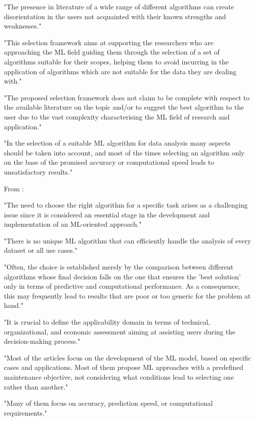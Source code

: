 "The presence in literature of a wide range of different algorithms can create disorientation in the users not acquainted with their known strengths and weaknesses."

"This selection framework aims at supporting the researchers who are approaching the ML field guiding them through the selection of a set of algorithms suitable for their scopes, helping them to avoid incurring in the application of algorithms which are not suitable for the data they are dealing with."

"The proposed selection framework does not claim to be complete with respect to the available literature on the topic and/or to suggest the best algorithm to the user due to the vast complexity characterising the ML field of research and application."

"In the selection of a suitable ML algorithm for data analysis many aspects should be taken into account, and most of the times selecting an algorithm only on the base of the promised accuracy or computational speed leads to unsatisfactory results."

From \parencite{arena2024conceptual_framework_ml_algorithm_selection_predictive_maintenance} :

"The need to choose the right algorithm for a specific task arises as a challenging issue since it is considered an essential stage in the development and implementation of an ML-oriented approach."

"There is no unique ML algorithm that can efficiently handle the analysis of every dataset or all use cases."

"Often, the choice is established merely by the comparison between different algorithms whose final decision falls on the one that ensures the 'best solution' only in terms of predictive and computational performance. As a consequence, this may frequently lead to results that are poor or too generic for the problem at hand."

"It is crucial to define the applicability domain in terms of technical, organizational, and economic assessment aiming at assisting users during the decision-making process."

"Most of the articles focus on the development of the ML model, based on specific cases and applications. Most of them propose ML approaches with a predefined maintenance objective, not considering what conditions lead to selecting one rather than another."

"Many of them focus on accuracy, prediction speed, or computational requirements."

